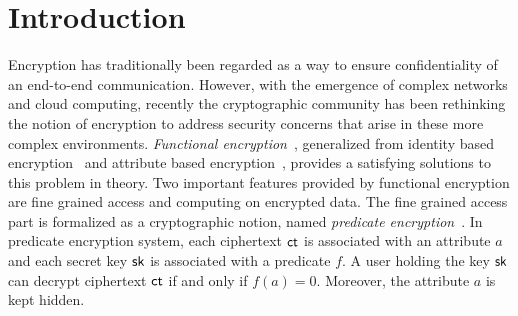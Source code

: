 \section{Introduction}
Encryption has traditionally been regarded as a way to ensure confidentiality of an end-to-end communication. However, with the emergence of complex networks and cloud computing, recently the cryptographic community has been rethinking the notion of encryption to address security concerns that arise in these more complex environments. \emph{Functional encryption}~\cite{TCC:BonSahWat11,cryptoeprint:2010:556}, generalized from identity based encryption~\cite{C:Shamir84,C:BonFra01} and attribute based encryption~\cite{CCS:GPSW06,SP:BetSahWat07}, provides a satisfying solutions to this problem in theory. Two important features provided by functional encryption are fine grained access and computing on encrypted data. The fine grained access part is formalized as a cryptographic notion, named \emph{predicate encryption}~\cite{TCC:BonWat07,EC:KatSahWat08}. In predicate encryption system, each ciphertext $\mathsf{ct}$ is associated with an attribute $a$ and each secret key $\mathsf{sk}$ is associated with a predicate $f$. A user holding the key $\mathsf{sk}$ can decrypt ciphertext $\mathsf{ct}$ if and only if $f(a) = 0$. Moreover, the attribute $a$ is kept hidden.

